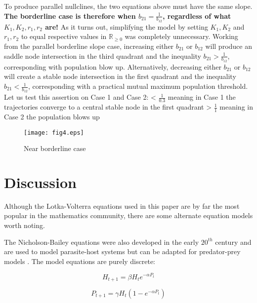 \documentclass[11pt,a4paper]{scrartcl}
\theoremstyle{definition}
\begin{document}
To produce parallel nullclines, the two equations above must have the same slope. \textbf{The borderline case is therefore when $b_{21}=\frac{1}{b_{12}}$, regardless of what $K_1,K_2,r_1,r_2$ are!} As it turns out, simplifying the model by setting $K_1,K_2$ and $r_1,r_2$ to equal respective values in $\mathbb{R}_{\geqslant 0}$ was completely unnecessary. Working from the parallel borderline slope case, increasing either $b_{21}$ or $b_{12}$ will produce an saddle node intersection in the third quadrant and the inequality $b_{21}>\frac{1}{b_{12}}$, corresponding with population blow up. Alternatively, decreasing either $b_{21}$ or $b_{12}$ will create a stable node intersection in the first quadrant and the inequality $b_{21}<\frac{1}{b_{12}}$, corresponding with a practical mutual maximum population threshold. Let us test this assertion on Case 1 and Case 2: \newline{} < $\frac{1}{0.3}$ meaning in Case 1 the trajectories converge to a central stable node in the first quadrant \checkmark {} > $\frac{1}{1}$ meaning in Case 2 the population blows up \checkmark
\begin{figure}[!ht]
\centering
\texttt{[image: fig4.eps]}
\caption{Near borderline case}
\label{figM3}
\end{figure}

\section{Discussion}
\lstset{showstringspaces=false}
Although the Lotka-Volterra equations used in this paper are by far the most popular in the mathematics community, there are some alternate equation models worth noting.\newline

The Nicholson-Bailey equations were also developed in the early $20^{th}$ century and are used to model parasite-host systems but can be adapted for predator-prey models \cite{Logan}. The model equations are purely discrete:

\begin{equation} \label{eq28}
	H_{t+1}=\beta H_te^{-\alpha P_t}
\end{equation}

\begin{equation} \label{eq29}
	P_{t+1}=\gamma H_t(1-e^{-\alpha P_t})
\end{equation}
\end{document}
